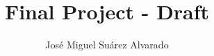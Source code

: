 \documentclass[a4paper,10pt,titlepage]{article}
\begin{document}
\author{José Miguel Suárez Alvarado}
\title{Final Project - Draft}
\maketitle
\tableofcontents






%
\clearpage
{}


\end{document}
